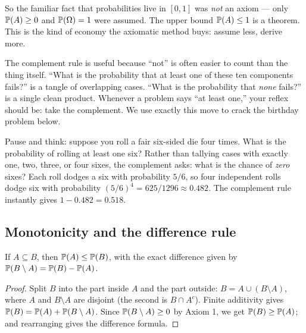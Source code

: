 So the familiar fact that probabilities live in $[0,1]$ was \emph{not} an axiom
--- only $\P(A)\ge 0$ and $\P(\Omega)=1$ were assumed. The upper bound $\P(A)\le1$
is a theorem. This is the kind of economy the axiomatic method
buys: assume less, derive more.

\begin{aestheticbox}
The complement rule is useful because ``not'' is often easier to count than the thing itself. ``What is
the probability that at least one of these ten components fails?'' is a tangle of
overlapping cases. ``What is the probability that \emph{none} fails?'' is a single
clean product. Whenever a problem says ``at least one,'' your reflex should be:
take the complement. We use exactly this move to crack the birthday problem
below.
\end{aestheticbox}

Pause and think: suppose you roll a fair six-sided die four times. What is the
probability of rolling at least one six? Rather than tallying cases with
exactly one, two, three, or four sixes, the complement asks: what is the chance
of \emph{zero} sixes? Each roll dodges a six with probability $5/6$, so four
independent rolls dodge six with probability $(5/6)^4 = 625/1296 \approx 0.482$.
The complement rule instantly gives $1 - 0.482 = 0.518$.

\subsection{Monotonicity and the difference rule}
\label{ch03:monotone}

\begin{proposition}[Monotonicity]
\label{ch03:prop-monotone}
If $A \subseteq B$, then $\P(A) \le \P(B)$, with the exact difference given by
$\P(B \setminus A) = \P(B) - \P(A)$.
\end{proposition}

\begin{proof}
Split $B$ into the part inside $A$ and the part outside: $B = A \cup
(B \setminus A)$, where $A$ and $B \setminus A$ are disjoint (the second is
$B \cap A^c$). Finite additivity gives
$\P(B) = \P(A) + \P(B \setminus A)$. Since $\P(B \setminus A) \ge 0$ by Axiom 1,
we get $\P(B) \ge \P(A)$; and rearranging gives the difference formula.
\end{proof}

